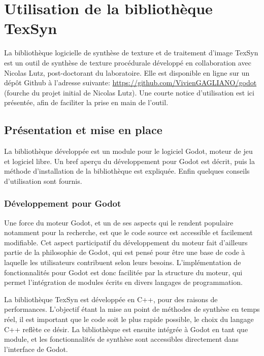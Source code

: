 \chapter{Utilisation de la bibliothèque TexSyn}
\label{app:texsyn-use}

La bibliothèque logicielle de synthèse de texture et de traitement d'image TexSyn est un outil de synthèse de texture procédurale développé en collaboration avec Nicolas Lutz, post-doctorant du laboratoire. Elle est disponible en ligne sur un dépôt Github à l'adresse suivante: \url{https://github.com/VivienGAGLIANO/godot} (fourche du projet initial de Nicolas Lutz). Une courte notice d'utilisation est ici présentée, afin de faciliter la prise en main de l'outil.

\section{Présentation et mise en place}

La bibliothèque développée est un module pour le logiciel Godot, moteur de jeu et logiciel libre. Un bref aperçu du développement pour Godot est décrit, puis la méthode d'installation de la bibliothèque est expliquée. Enfin quelques conseils d'utilisation sont fournis.

\subsection{Développement pour Godot}

Une force du moteur Godot, et un de ses aspects qui le rendent populaire notamment pour la recherche, est que le code source est accessible et facilement modifiable. Cet aspect participatif du développement du moteur fait d'ailleurs partie de la philosophie de Godot, qui est pensé pour être une base de code à laquelle les utilisateurs contribuent selon leurs besoins. L'implémentation de fonctionnalités pour Godot est donc facilitée par la structure du moteur, qui permet l'intégration de modules écrits en divers langages de programmation.

\bigskip

La bibliothèque TexSyn est développée en C++, pour des raisons de performances. L'objectif étant la mise au point de méthodes de synthèse en temps réel, il est important que le code soit le plus rapide possible, le choix du langage C++ reflète ce désir. La bibliothèque est ensuite intégrée à Godot en tant que module, et les fonctionnalités de synthèse sont accessibles directement dans l'interface de Godot.

